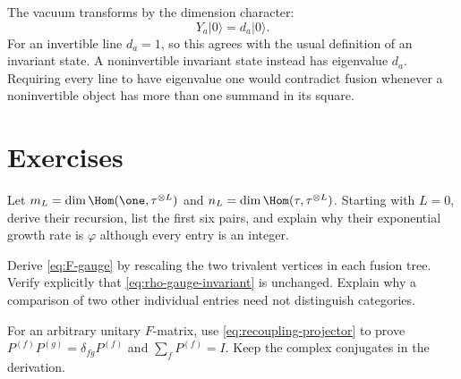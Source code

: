 The vacuum transforms by the dimension character:
\[
 Y_a|0\rangle=d_a|0\rangle.
\]
For an invertible line $d_a=1$, so this agrees with the usual
definition of an invariant state.  A noninvertible invariant state
instead has eigenvalue $d_a$.  Requiring every line to have eigenvalue
one would contradict fusion whenever a noninvertible object has more
than one summand in its square.

\section{Exercises}

\begin{exercise}\label{ex:fib-count}
Let $m_L=\dim\Hom(\one,\tau^{\otimes L})$ and
$n_L=\dim\Hom(\tau,\tau^{\otimes L})$.  Starting with $L=0$,
derive their recursion, list the first six pairs, and explain why
their exponential growth rate is $\varphi$ although every entry is an
integer.

\par\smallskip{}\par
\end{exercise}

\begin{exercise}\label{ex:gauge-cancel}
Derive \eqref{eq:F-gauge} by rescaling the two trivalent vertices
in each fusion tree.  Verify explicitly that
\eqref{eq:rho-gauge-invariant} is unchanged.  Explain why a comparison
of two other individual entries need not distinguish categories.

\par\smallskip{}\par
\end{exercise}

\begin{exercise}\label{ex:projectors}
For an arbitrary unitary $F$-matrix, use
\eqref{eq:recoupling-projector} to prove
$P^{(f)}P^{(g)}=\delta_{fg}P^{(f)}$ and $\sum_fP^{(f)}=I$.
Keep the complex conjugates in the derivation.

\par\smallskip{}\par
\end{exercise}

